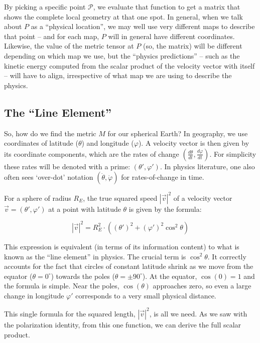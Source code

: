 \documentclass[twocolumn]{article}
\begin{document}
By picking a specific point \(\mathcal P\), we evaluate that function
to get a matrix that shows the complete local geometry at that one
spot. In general, when we talk about $P$ as a ``physical location'',
we may well use very different maps to describe that point -- and for
each map, $P$ will in general have different coordinates. Likewise,
the value of the metric tensor at $P$ (so, the matrix) will be
different depending on which map we use, but the ``physics
predictions'' -- such as the kinetic energy computed from the scalar
product of the velocity vector with itself -- will have to align,
irrespective of what map we are using to describe the physics.




\subsection{The ``Line Element''}\label{sec:ds2}

So, how do we find the metric \(M\) for our spherical Earth? In
geography, we use coordinates of latitude (\(\theta\)) and longitude
(\(\varphi\)). A velocity vector is then given by its coordinate
components, which are the rates of change
\(\left( \frac{d\theta}{dt}, \frac{d\varphi}{dt} \right)\). For
simplicity these rates will be denoted with a prime:
\((\theta', \varphi')\). In physics literature, one also often
sees `over-dot' notation \((\dot\theta, \dot\varphi)\) for
rates-of-change in time.

For a sphere of radius \(R_E\), the true squared speed \(|\vec{v}|^2\)
of a velocity vector \(\vec{v} = (\theta', \varphi')\) at a point with
latitude \(\theta\) is given by the formula:

\begin{equation}|\vec{v}|^2 = R_E^2 \cdot \left( (\theta')^2 + (\varphi')^2 \cos^2 \theta \right)\end{equation}

This expression is equivalent (in terms of its information content) to
what is known as the ``line element'' in physics. The crucial term
is \(\cos^2 \theta\). It correctly accounts for the fact that circles
of constant latitude shrink as we move from the equator (\(\theta =
0^{\circ}\)) towards the poles (\(\theta = \pm 90^{\circ}\)). At the
equator, \(\cos(0) = 1\) and the formula is simple. Near the
poles, \(\cos(\theta)\) approaches zero, so even a large change in
longitude \(\varphi'\) corresponds to a very small physical distance.

This single formula for the squared length, \(|\vec{v}|^2\), is all we
need. As we saw with the polarization identity, from this one function,
we can derive the full scalar product.
\end{document}
